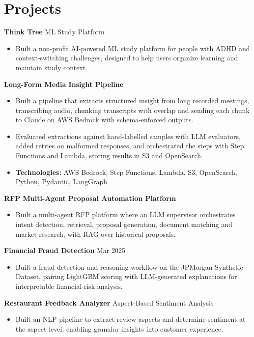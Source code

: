 \documentclass[10pt,a4paper]{article}
\begin{document}
\section{Projects}
\textbf{Think Tree} \textbar{} ML Study Platform\par
\begin{itemize}
  \item Built a non-profit AI-powered ML study platform for people with ADHD and context-switching challenges, designed to help users organize learning and maintain study context.
\end{itemize}
\textbf{Long-Form Media Insight Pipeline}\par
\begin{itemize}
  \item Built a pipeline that extracts structured insight from long recorded meetings, transcribing audio, chunking transcripts with overlap and sending each chunk to Claude on AWS Bedrock with schema-enforced outputs.
  \item Evaluated extractions against hand-labelled samples with LLM evaluators, added retries on malformed responses, and orchestrated the steps with Step Functions and Lambda, storing results in S3 and OpenSearch.
  \item \textbf{Technologies:} AWS Bedrock, Step Functions, Lambda, S3, OpenSearch, Python, Pydantic, LangGraph
\end{itemize}
\textbf{RFP Multi-Agent Proposal Automation Platform}\par
\begin{itemize}
  \item Built a multi-agent RFP platform where an LLM supervisor orchestrates intent detection, retrieval, proposal generation, document matching and market research, with RAG over historical proposals.
\end{itemize}
\textbf{Financial Fraud Detection} \textbar{} Mar 2025\par
\begin{itemize}
  \item Built a fraud detection and reasoning workflow on the JPMorgan Synthetic Dataset, pairing LightGBM scoring with LLM-generated explanations for interpretable financial-risk analysis.
\end{itemize}
\textbf{Restaurant Feedback Analyzer} \textbar{} Aspect-Based Sentiment Analysis\par
\begin{itemize}
  \item Built an NLP pipeline to extract review aspects and determine sentiment at the aspect level, enabling granular insights into customer experience.
\end{itemize}
\end{document}
